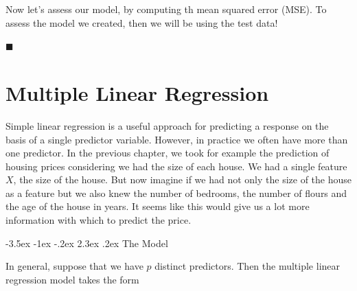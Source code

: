 \documentclass[]{book}
\makeatletter
\newenvironment{Shaded}{\begin{snugshade}}{\end{snugshade}}
\newcommand{\KeywordTok}[1]{\textcolor[rgb]{0.13,0.29,0.53}{\textbf{#1}}}
\newcommand{\DataTypeTok}[1]{\textcolor[rgb]{0.13,0.29,0.53}{#1}}
\newcommand{\DecValTok}[1]{\textcolor[rgb]{0.00,0.00,0.81}{#1}}
\newcommand{\StringTok}[1]{\textcolor[rgb]{0.31,0.60,0.02}{#1}}
\newcommand{\CommentTok}[1]{\textcolor[rgb]{0.56,0.35,0.01}{\textit{#1}}}
\newcommand{\OperatorTok}[1]{\textcolor[rgb]{0.81,0.36,0.00}{\textbf{#1}}}
\newcommand{\NormalTok}[1]{#1}
\renewcommand\section{\@startsection {section}{1}{\z@}%
                                   {-3.5ex \@plus -1ex \@minus -.2ex}%
                                   {2.3ex \@plus.2ex}%
                                   {\normalfont\Large\bfseries\color{ForestGreen}}}
\theoremstyle{definition}
\theoremstyle{definition}
\theoremstyle{definition}
\theoremstyle{remark}
\makeatother
\begin{document}
Now let's assess our model, by computing th mean squared error (MSE). To
assess the model we created, then we will be using the test data!

\begin{Shaded}
\end{Shaded}

◼

\chapter{Multiple Linear Regression}\label{multiple-linear-regression}

Simple linear regression is a useful approach for predicting a response
on the basis of a single predictor variable. However, in practice we
often have more than one predictor. In the previous chapter, we took for
example the prediction of housing prices considering we had the size of
each house. We had a single feature \(X\), the size of the house. But
now imagine if we had not only the size of the house as a feature but we
also knew the number of bedrooms, the number of flours and the age of
the house in years. It seems like this would give us a lot more
information with which to predict the price.

\section{The Model}\label{the-model}

In general, suppose that we have \(p\) distinct predictors. Then the
multiple linear regression model takes the form
\end{document}
